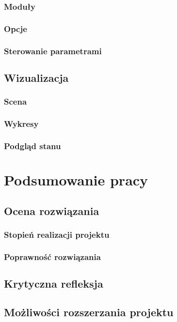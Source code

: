 \documentclass[12pt, oneside]{report}
\theoremstyle{definition}
\begin{document}
\subsection{Moduły}
\subsection{Opcje}
\subsection{Sterowanie parametrami}
\section{Wizualizacja}
\subsection{Scena}
\subsection{Wykresy}
\subsection{Podgląd stanu}
	
\newpage
\chapter{Podsumowanie pracy}
\section{Ocena rozwiązania}
\subsection{Stopień realizacji projektu}
\subsection{Poprawność rozwiązania}
\section{Krytyczna refleksja}
\section{Możliwości rozszerzania projektu}
	
\end{document}
